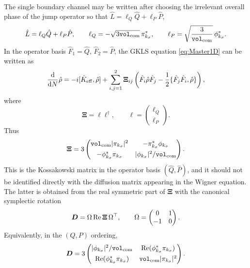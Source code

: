 \documentclass{article}
\newcommand{\VF}{\mathtt{vol}_{\rm com}}
\numberwithin{equation}{section}
\begin{document}
	The single boundary channel may be written after choosing the irrelevant overall phase of the jump operator so that \(\hat L=\ell_Q\hat Q+\ell_P\hat P\),
	\begin{equation}
		\hat L=\ell_Q\hat Q+\ell_P\hat P, \qquad \ell_Q=-\sqrt{3\VF}\,\pi_{k_\sigma}^*, \qquad \ell_P=\sqrt{\frac{3}{\VF}}\,\phi_{k_\sigma}^* .
		\label{eq:ellQPdef}
	\end{equation}
	In the operator basis \(\hat F_1=\hat Q\), \(\hat F_2=\hat P\), the GKLS equation \cref{eq:Master1D} can be written as
	\begin{equation}
		\dv{}{N}\hat\rho =-i [\hat K_{\rm eff},\hat\rho] +\sum_{i,j=1}^2 \bm\Xi_{ij} \left( \hat F_i\hat\rho\hat F_j -\frac12\{\hat F_j\hat F_i,\hat\rho\} \right),
	\end{equation}
	where
	\begin{equation}
		\bm\Xi=\ell\ell^\dagger, \qquad \ell=\begin{pmatrix}\ell_Q\\ \ell_P\end{pmatrix}.
	\end{equation}
	Thus
	\begin{equation}
		\bm\Xi = 3
		\begin{pmatrix}
			\VF|\pi_{k_\sigma}|^2 & -\pi_{k_\sigma}^*\phi_{k_\sigma} \\[4pt] -\phi_{k_\sigma}^*\pi_{k_\sigma} & |\phi_{k_\sigma}|^2/\VF
		\end{pmatrix}.
		\label{eq:RankOneQPKossakowski}
	\end{equation}
	This is the Kossakowski matrix in the operator basis \((\hat Q,\hat P)\), and it should not be identified directly with the diffusion matrix appearing in the Wigner equation. The latter is obtained from the real symmetric part of \(\bm\Xi\) with the canonical symplectic rotation
	\begin{equation}
		\bm D = \Omega\,{\rm Re}\,\bm\Xi\,\Omega^\top, \qquad \Omega=
		\begin{pmatrix}
			0 & 1\\ -1 & 0
		\end{pmatrix}.
		\label{eq:DiffusionFromKossakowski}
	\end{equation}
	Equivalently, in the \((Q,P)\) ordering,
	\begin{equation}
		\bm D = 3
		\begin{pmatrix}
			|\phi_{k_\sigma}|^2/\VF & \Re(\phi_{k_\sigma}^*\pi_{k_\sigma}) \\[4pt] \Re(\phi_{k_\sigma}^*\pi_{k_\sigma}) & \VF|\pi_{k_\sigma}|^2
		\end{pmatrix}.
	\end{equation}
\end{document}
